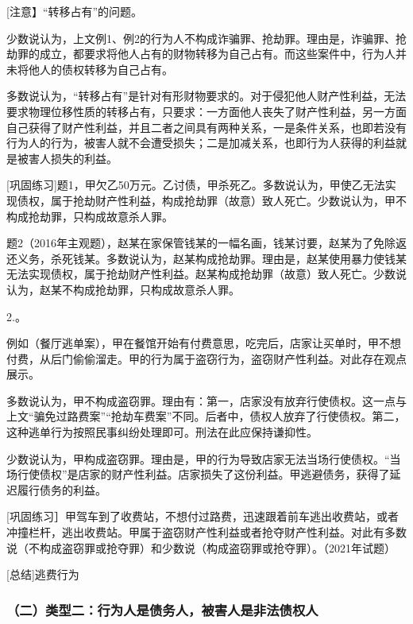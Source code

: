 [注意】“转移占有”的问题。

少数说认为，上文例1、例2的行为人不构成诈骗罪、抢劫罪。理由是，诈骗罪、抢劫罪的成立，都要求将他人占有的财物转移为自己占有。而这些案件中，行为人并未将他人的债权转移为自己占有。

多数说认为，“转移占有”是针对有形财物要求的。对于侵犯他人财产性利益，无法要求物理位移性质的转移占有，只要求：一方面他人丧失了财产性利益，另一方面自己获得了财产性利益，并且二者之间具有两种关系，一是条件关系，也即若没有行为人的行为，被害人就不会遭受损失；二是加减关系，也即行为人获得的利益就是被害人损失的利益。

[巩固练习]题1，甲欠乙50万元。乙讨债，甲杀死乙。多数说认为，甲使乙无法实现债权，属于抢劫财产性利益，构成抢劫罪（故意）致人死亡。少数说认为，甲不构成抢劫罪，只构成故意杀人罪。

题2（2016年主观题），赵某在家保管钱某的一幅名画，钱某讨要，赵某为了免除返还义务，杀死钱某。多数说认为，赵某构成抢劫罪。理由是，赵某使用暴力使钱某无法实现债权，属于抢劫财产性利益。赵某构成抢劫罪（故意）致人死亡。少数说认为，赵某不构成抢劫罪，只构成故意杀人罪。

2.。

例如（餐厅逃单案），甲在餐馆开始有付费意思，吃完后，店家让买单时，甲不想付费，从后门偷偷溜走。甲的行为属于盗窃行为，盗窃财产性利益。对此存在观点展示。

多数说认为，甲不构成盗窃罪。理由有：第一，店家没有放弃行使债权。这一点与上文“骗免过路费案”“抢劫车费案”不同。后者中，债权人放弃了行使债权。第二，这种逃单行为按照民事纠纷处理即可。刑法在此应保持谦抑性。

少数说认为，甲构成盗窃罪。理由是，甲的行为导致店家无法当场行使债权。“当场行使债权”是店家的财产性利益。店家损失了这份利益。甲逃避债务，获得了延迟履行债务的利益。

[巩固练习］甲驾车到了收费站，不想付过路费，迅速跟着前车逃出收费站，或者冲撞栏杆，逃出收费站。甲属于盗窃财产性利益或者抢夺财产性利益。对此有多数说（不构成盗窃罪或抢夺罪）和少数说（构成盗窃罪或抢夺罪）。（2021年试题）

[总结]逃费行为


\subsubsection*{（二）类型二：行为人是债务人，被害人是非法债权人}

